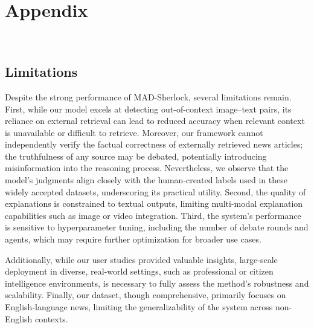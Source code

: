 \documentclass{article}
\theoremstyle{plain}
\theoremstyle{definition}
\theoremstyle{remark}
\newcommand{\frameworkname}{MAD-Sherlock}
\begin{document}
\pagebreak


\newpage
\appendix
\onecolumn


\newpage
\section{Appendix}\

\subsection{Limitations}
\label{app:limitations}

Despite the strong performance of \frameworkname{}, several limitations remain. First, while our model excels at detecting out-of-context image–text pairs, its reliance on external retrieval can lead to reduced accuracy when relevant context is unavailable or difficult to retrieve. Moreover, our framework cannot independently verify the factual correctness of externally retrieved news articles; the truthfulness of any source may be debated, potentially introducing misinformation into the reasoning process. Nevertheless, we observe that the model’s judgments align closely with the human-created labels used in these widely accepted datasets, underscoring its practical utility. Second, the quality of explanations is constrained to textual outputs, limiting multi-modal explanation capabilities such as image or video integration. Third, the system’s performance is sensitive to hyperparameter tuning, including the number of debate rounds and agents, which may require further optimization for broader use cases.

Additionally, while our user studies provided valuable insights, large-scale deployment in diverse, real-world settings, such as professional or citizen intelligence environments, is necessary to fully assess the method’s robustness and scalability. Finally, our dataset, though comprehensive, primarily focuses on English-language news, limiting the generalizability of the system across non-English contexts.
\end{document}
